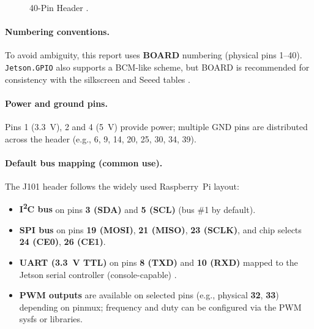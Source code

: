\begin{figure}[h!]
	\centering
	
	\caption{40-Pin Header {\setlength{\fboxrule}{1.25pt}\setlength{\fboxsep}{0.75pt}}.}
	\label{fig:40-pin_header}
\end{figure}
\paragraph{Numbering conventions.}
To avoid ambiguity, this report uses \textbf{BOARD} numbering (physical pins 1--40). 
\texttt{Jetson.GPIO} also supports a BCM-like scheme, but BOARD is recommended for consistency with the silkscreen and Seeed tables \cite{reComputer_Jetson_GPIO}.

\paragraph{Power and ground pins.}
Pins 1 (3.3~V), 2 and 4 (5~V) provide power; multiple GND pins are distributed across the header (e.g., 6, 9, 14, 20, 25, 30, 34, 39).

\paragraph{Default bus mapping (common use).}
The J101 header follows the widely used Raspberry~Pi layout:
\begin{itemize}
	\item \textbf{I\textsuperscript{2}C bus} on pins \textbf{3 (SDA)} and \textbf{5 (SCL)} (bus \#1 by default).
	\item \textbf{\ac{SPI} bus} on pins \textbf{19 (MOSI)}, \textbf{21 (MISO)}, \textbf{23 (SCLK)}, and chip selects \textbf{24 (CE0)}, \textbf{26 (CE1)}.
	\item \textbf{\ac{UART} (3.3~V TTL)} on pins \textbf{8 (TXD)} and \textbf{10 (RXD)} mapped to the Jetson serial controller (console-capable) \cite{seeedJ101Manual}.
	\item \textbf{\ac{PWM} outputs} are available on selected pins (e.g., physical \textbf{32}, \textbf{33}) depending on pinmux; frequency and duty can be configured via the \ac{PWM} sysfs or libraries.
\end{itemize}



